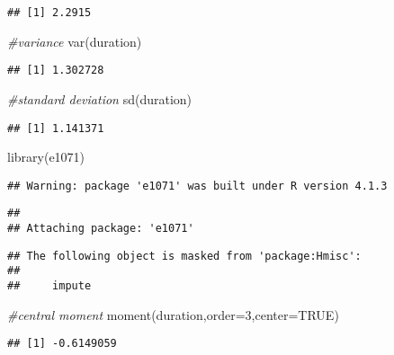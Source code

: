 \documentclass[
]{article}
\newenvironment{Shaded}{\begin{snugshade}}{\end{snugshade}}
\newcommand{\AttributeTok}[1]{\textcolor[rgb]{0.77,0.63,0.00}{#1}}
\newcommand{\CommentTok}[1]{\textcolor[rgb]{0.56,0.35,0.01}{\textit{#1}}}
\newcommand{\ConstantTok}[1]{\textcolor[rgb]{0.00,0.00,0.00}{#1}}
\newcommand{\DecValTok}[1]{\textcolor[rgb]{0.00,0.00,0.81}{#1}}
\newcommand{\FunctionTok}[1]{\textcolor[rgb]{0.00,0.00,0.00}{#1}}
\newcommand{\NormalTok}[1]{#1}
\begin{document}
\begin{verbatim}
## [1] 2.2915
\end{verbatim}

\begin{Shaded}
\begin{Highlighting}[]
\CommentTok{\#variance}
\FunctionTok{var}\NormalTok{(duration)}
\end{Highlighting}
\end{Shaded}

\begin{verbatim}
## [1] 1.302728
\end{verbatim}

\begin{Shaded}
\begin{Highlighting}[]
\CommentTok{\#standard deviation}
\FunctionTok{sd}\NormalTok{(duration)}
\end{Highlighting}
\end{Shaded}

\begin{verbatim}
## [1] 1.141371
\end{verbatim}

\begin{Shaded}
\begin{Highlighting}[]
\FunctionTok{library}\NormalTok{(e1071)}
\end{Highlighting}
\end{Shaded}

\begin{verbatim}
## Warning: package 'e1071' was built under R version 4.1.3
\end{verbatim}

\begin{verbatim}
## 
## Attaching package: 'e1071'
\end{verbatim}

\begin{verbatim}
## The following object is masked from 'package:Hmisc':
## 
##     impute
\end{verbatim}

\begin{Shaded}
\begin{Highlighting}[]
\CommentTok{\#central moment}
\FunctionTok{moment}\NormalTok{(duration,}\AttributeTok{order=}\DecValTok{3}\NormalTok{,}\AttributeTok{center=}\ConstantTok{TRUE}\NormalTok{)}
\end{Highlighting}
\end{Shaded}

\begin{verbatim}
## [1] -0.6149059
\end{verbatim}
\end{document}

